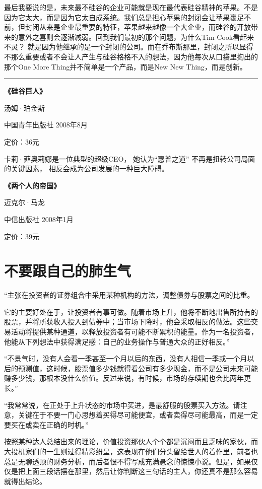 最后我要说的是，未来最不硅谷的企业可能就是现在最代表硅谷精神的苹果。不是因为它太大，而是因为它太自成系统。我们总是担心苹果的封闭会让苹果裹足不前，但封闭从来是企业最重要的特征，苹果越来越像一个大企业，而硅谷的开放带来的意外之喜则会逐渐减弱。回到我们最初的那个问题，为什么Tim
Cook看起来不灵？
就是因为他继承的是一个封闭的公司。而在乔布斯那里，封闭之所以显得不那么重要或者不会让人产生与硅谷格格不入的想法，因为他每次从口袋里掏出的那个One
More Thing并不简单是一个产品，而是New New Thing，而是创新。

\begin{center}\rule{3in}{0.4pt}\end{center}

\textbf{《硅谷巨人》}

汤姆·珀金斯

中国青年出版社 2008年8月

定价：36元

卡莉·菲奥莉娜是一位典型的超级CEO， 她认为``惠普之道''
不再是扭转公司局面的关键因素， 相反会成为公司发展的一种巨大障碍。

\textbf{《两个人的帝国》}

迈克尔·马龙

中信出版社 2008年1月

定价：39元

\section{不要跟自己的肺生气}

``主张在投资者的证券组合中采用某种机构的方法，调整债券与股票之间的比重。

它的主要好处在于，让投资者有事可做。随着市场上升，他将不断地出售所持有的股票，并将所获收入投入到债券中；当市场下降时，他会采取相反的做法。这些交易活动将提供某种通道，以释放投资者有可能不断累积的能量。作为一名投资者，他能从下列想法中获得满足感：自己的业务操作与普通大众的正好相反。''

``不景气时，没有人会看一季甚至一个月以后的东西，没有人相信一季或一个月以后的预测值，这时候，股票值多少钱就得看公司有多少现金，而不是公司未来可能赚多少钱，那根本没什么价值。反过来说，有时候，市场的存续期也会比两年更长。''

``我常常说，在正处于上升状态的市场中买进，是最舒服的股票买入方法。请注意，关键在于不要一门心思想着买得尽可能便宜，或者卖得尽可能最高，而是一定要买在或卖在正确的时机。''

按照某种达人总结出来的理论，价值投资那伙人个个都是沉闷而且乏味的家伙，而大投机家们的一生则过得精彩纷呈，这表现在他们分头留给世人的着作里，前者也总是无聊透顶的财务分析，而后者恨不得写成充满悬念的惊悚小说。但是，如果仅仅是把上面三段话摆在那里，然后让你判断这三句话的主人，你还真不是那么容易就得出结论。

